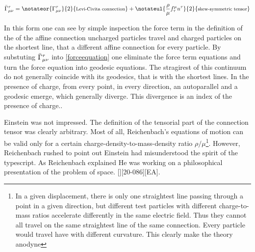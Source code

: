 \documentclass[draft]{article}
\newcommand{\Gtmnbar}{\ensuremath{\bar{\Gamma}\tmn}\xspace}
\begin{document}
  
\begin{equation*}\label{eq:reichenbachconnection}
\Gtmnbar = \notateor{\Gtmn}{2}{\texts{Levi-Civita connection}} + \notateul{\frac{\rho}{\mu} f_{\tau}^{\mu} u^\tau}{2}{\texts{skew-symmetric tensor}}
\end{equation*}

In this form one can see by simple inspection the force term in the definition of the of the affine connection uncharged particles travel and charged particles on the shortest line, that a different affine connection for every particle. By substuting \Gtmnbar into \cref{forceequation} one eliminate the force term equations and turn the force equation into geodesic equations. The stragirest of this continuum do not generally coincide with its geodesics, that is with the shortest lines. In the presence of charge, from every point, in every direction, an autoparallel and a geodesic emerge, which generally diverge. This divergence is an index of the presence of charge..

Einstein was not impressed. The definition of the tensorial part of the connection tensor was clearly arbitrary. Most of all, Reichenbach's equations of motion can be valid only for a certain charge-density-to-mass-density ratio $\rho/\mu$\footnote{In a given displacement, there is only one straightest line passing through a point in a given direction, but different test particles with different charge-to-mass ratios accelerate differently in the same electric field. Thus they cannot all travel on the same straightest line of the same connection. Every particle would travel have with different curvature. This clearly make the theory anodyne}. However, Reichenbach rushed to point out Einstein had misunderstood the spirit of the typescript. As Reichenbach explained He was working on a philosophical presentation of the problem of space. [][20-086][EA]. 
\end{document}
